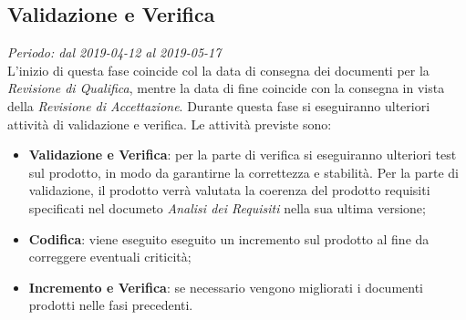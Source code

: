 \subsection{Validazione e Verifica}
\textit{Periodo: dal 2019-04-12 al 2019-05-17 } \\
L'inizio di questa fase coincide col la data di consegna dei documenti per la 
\textit{Revisione di Qualifica}, mentre la data di fine coincide con la 
consegna in vista della \textit{Revisione di Accettazione}. Durante questa fase 
si eseguiranno ulteriori attività di validazione e verifica. Le attività 
previste sono: 
\begin{itemize}
	\item \textbf{Validazione e Verifica}: per la parte di verifica si 
	eseguiranno ulteriori test sul prodotto, in modo da garantirne la 
	correttezza e stabilità. Per la parte di validazione, il prodotto verrà 
	valutata la coerenza del prodotto requisiti specificati nel documeto 
	\textit{Analisi dei Requisiti} nella sua ultima versione;
	\item \textbf{Codifica}: viene eseguito eseguito un incremento sul prodotto 
	al fine da correggere eventuali criticità;
	\item \textbf{Incremento e Verifica}: se necessario vengono migliorati i 
	documenti prodotti nelle fasi precedenti.
\end{itemize}